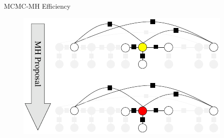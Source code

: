 \documentclass[onlymath,xcolor=pdftex,dvipsnames,table]{beamer}
\newcommand{\head}[1]{{\large\color{OliveGreen}#1\\[2pt]}}
\begin{document}
\begin{frame}{MCMC-MH Efficiency}
\begin{figure}
  \centering
  \includegraphics[width=.6\textwidth]{mcmc.pdf}
\end{figure}
\end{frame}






\end{document}
